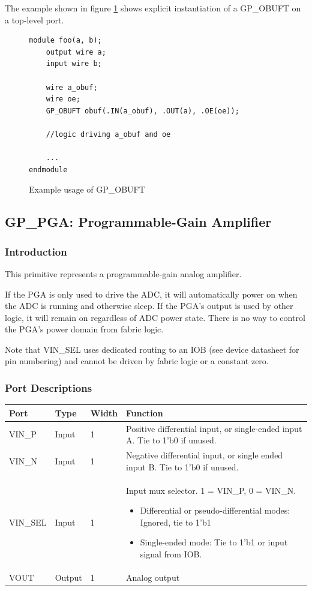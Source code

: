 \documentclass[11pt]{article}
\begin{document}
The example shown in figure \ref{gp-obuft-example} shows explicit instantiation of a GP\_OBUFT on a top-level port.

\begin{figure}[h]
\begin{lstlisting}
module foo(a, b);
	output wire a;
	input wire b;
	
	wire a_obuf;
	wire oe;
	GP_OBUFT obuf(.IN(a_obuf), .OUT(a), .OE(oe));
	
	//logic driving a_obuf and oe
	
	...
endmodule
\end{lstlisting}
\caption{Example usage of GP\_OBUFT}
\label{gp-obuft-example}
\end{figure}


\pagebreak
\clearpage
\subsection{GP\_PGA: Programmable-Gain Amplifier}

\subsubsection{Introduction}
This primitive represents a programmable-gain analog amplifier.

If the PGA is only used to drive the ADC, it will automatically power on when the ADC is running and otherwise sleep. 
If the PGA's output is used by other logic, it will remain on regardless of ADC power state. There is no way to control 
the PGA's power domain from fabric logic.

Note that VIN\_SEL uses dedicated routing to an IOB (see device datasheet for pin numbering) and cannot be driven 
by fabric logic or a constant zero.

\subsubsection{Port Descriptions}

\begin{tabularx}{5in}{|l|l|l|X|}
\hline
{\bfseries Port} & {\bfseries Type} & {\bfseries Width} & {\bfseries Function} \\
\hline
VIN\_P & Input & 1 & Positive differential input, or single-ended input A. Tie to 1'b0 if unused.\\
\hline
VIN\_N & Input & 1 & Negative differential input, or single ended input B. Tie to 1'b0 if unused.\\
\hline
VIN\_SEL & Input & 1 & Input mux selector. 1 = VIN\_P, 0 = VIN\_N.
	\begin{itemize}
		\item Differential or pseudo-differential modes: Ignored, tie to 1'b1
		\item Single-ended mode: Tie to 1'b1 or input signal from IOB.
	\end{itemize}\\
\hline
VOUT & Output & 1 & Analog output\\
\hline
\end{tabularx}
\end{document}

